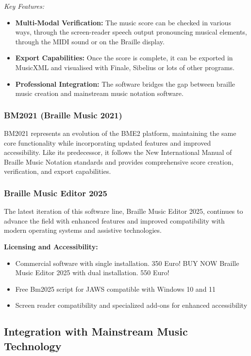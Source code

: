 \emph{Key Features:}
\begin{itemize}
    \item \textbf{Multi-Modal Verification:} The music score can be checked in various ways, through the screen-reader speech output pronouncing musical elements, through the MIDI sound or on the Braille display.
    \item \textbf{Export Capabilities:} Once the score is complete, it can be exported in MusicXML and visualised with Finale, Sibelius or lots of other programs.
    \item \textbf{Professional Integration:} The software bridges the gap between braille music creation and mainstream music notation software.
\end{itemize}

\subsubsection{BM2021 (Braille Music 2021)}
BM2021 represents an evolution of the BME2 platform, maintaining the same core functionality while incorporating updated features and improved accessibility. Like its predecessor, it follows the New International Manual of Braille Music Notation standards and provides comprehensive score creation, verification, and export capabilities.

\subsubsection{Braille Music Editor 2025}
The latest iteration of this software line, Braille Music Editor 2025, continues to advance the field with enhanced features and improved compatibility with modern operating systems and assistive technologies.

\textbf{Licensing and Accessibility:}
\begin{itemize}
    \item Commercial software with single installation. 350 Euro! BUY NOW Braille Music Editor 2025 with dual installation. 550 Euro!
    \item Free Bm2025 script for JAWS compatible with Windows 10 and 11
    \item Screen reader compatibility and specialized add-ons for enhanced accessibility
\end{itemize}

\subsection{Integration with Mainstream Music Technology}

